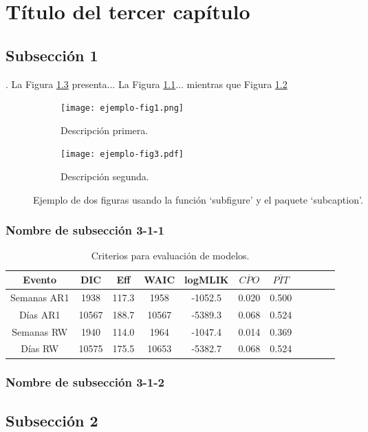 
\chapter{Título del tercer capítulo}
\label{chap:Infe}

\lipsum[10]


\section{Subsección 1}
\lipsum[100]. La Figura \ref{fig:subfiguras} presenta... La Figura \ref{fig:primera}... mientras que Figura \ref{fig:segunda}

\begin{figure}
	\centering
	\begin{subfigure}{0.45\textwidth}
		\texttt{[image: ejemplo-fig1.png]}
		\caption{Descripción primera.}
		\label{fig:primera}
	\end{subfigure}
	\hfill
	\begin{subfigure}{0.45\textwidth}
		\center
		\texttt{[image: ejemplo-fig3.pdf]}
		\caption{Descripción segunda.}
		\label{fig:segunda}
	\end{subfigure}
	\hfill
	\caption{Ejemplo de dos figuras usando la función `subfigure' y el paquete `subcaption'.}
	\label{fig:subfiguras}
\end{figure}

\lipsum[1-4]






\subsection{Nombre de subsección 3-1-1}
\lipsum[100]
   \begin{table}
	\begin{center}
		\begin{tabular}{ c c  c   c c  c  c c c c c}
			Evento & DIC & Eff & WAIC & logMLIK  & $\overline{CPO}$ & $\overline{PIT}$  \\ \hline \hline
			Semanas AR1 & 1938 & 117.3 & 1958 & -1052.5 &  0.020 &  0.500 \\
			D\'ias AR1 & 10567 & 188.7 & 10567 & -5389.3 &  0.068 & 0.524 \\
			Semanas RW & 1940 & 114.0 & 1964 &  -1047.4 &  0.014 & 0.369 \\
			D\'ias RW & 10575 & 175.5 & 10653 & -5382.7 & 0.068 & 0.524 \\
			\hline  
		\end{tabular}
	\end{center}
	\caption{Criterios para evaluación de modelos.}
	\label{tab:CriteriosTemporal}
\end{table}


\subsection{Nombre de subsección 3-1-2}
\lipsum[17]

\section{Subsección 2}
\lipsum[100] 




